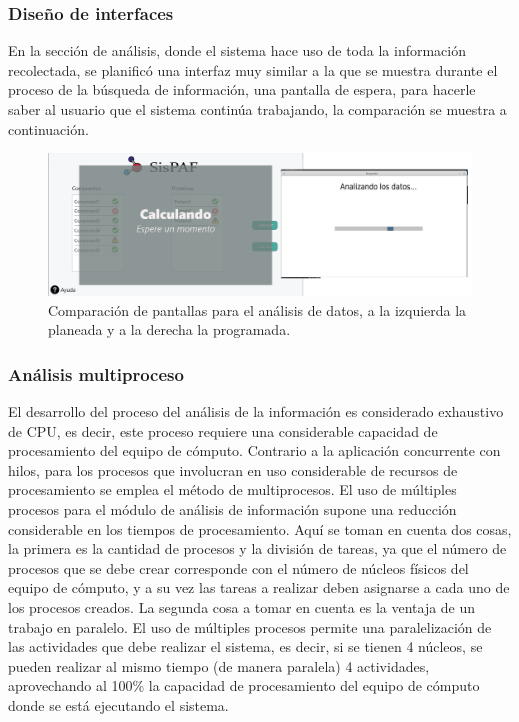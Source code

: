 \subsubsection{Diseño de interfaces}{
\noindent En la sección de análisis, donde el sistema hace uso de toda la información recolectada, se planificó una interfaz muy similar a la que se muestra durante el proceso de la búsqueda de información, una pantalla de espera,  para hacerle saber al usuario que el sistema  continúa trabajando, la comparación se muestra a continuación.

\begin{figure}[H]
    \centering
    \includegraphics[scale=0.27]{Capitulo4/Documentos/imagenes_generacion/Analisis.png}
    \caption{Comparación de pantallas para el análisis de datos, a la izquierda la planeada y a la derecha la programada.}
    \label{comparacion_6l}
\end{figure}
}
\subsubsection{Análisis multiproceso}{
\noindent El desarrollo del proceso del análisis de la información es considerado exhaustivo de CPU, es decir, este proceso requiere una considerable capacidad de procesamiento del equipo de cómputo. Contrario a la aplicación concurrente con hilos, para los procesos que involucran en uso considerable de recursos de procesamiento se emplea el método de multiprocesos. El uso de múltiples procesos para el módulo de análisis de información supone una reducción considerable en los tiempos de procesamiento. Aquí se toman en cuenta dos cosas, la primera es la cantidad de procesos y la división de tareas, ya que el número de procesos que se debe crear corresponde con el número de núcleos físicos del equipo de cómputo, y a su vez las tareas a realizar deben asignarse a cada uno de los procesos creados. La segunda cosa a tomar en cuenta es la ventaja de un trabajo en paralelo. El uso de múltiples procesos permite una paralelización de las actividades que debe realizar el sistema, es decir, si se tienen 4 núcleos, se pueden realizar al mismo tiempo (de manera paralela) 4 actividades, aprovechando al 100\% la capacidad de procesamiento del equipo de cómputo donde se está ejecutando el sistema.



}
